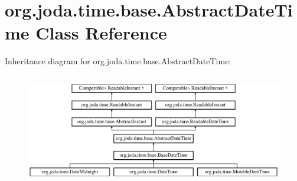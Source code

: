\hypertarget{classorg_1_1joda_1_1time_1_1base_1_1_abstract_date_time}{\section{org.\-joda.\-time.\-base.\-Abstract\-Date\-Time Class Reference}
\label{classorg_1_1joda_1_1time_1_1base_1_1_abstract_date_time}
}
Inheritance diagram for org.\-joda.\-time.\-base.\-Abstract\-Date\-Time\-:\begin{figure}[H]
\begin{center}
\leavevmode
\includegraphics[height=4.933921cm]{classorg_1_1joda_1_1time_1_1base_1_1_abstract_date_time}
\end{center}
\end{figure}
